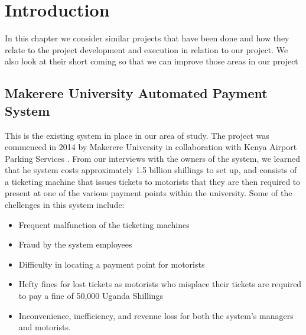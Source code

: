 \section{Introduction}
In this chapter we consider similar projects that have been done and how they relate to the project development and execution in relation to our project. We also look at their short coming so that we can improve those areas in our project

\subsection{Makerere University Automated Payment System}
This is the existing system in place in our area of study. The project was commenced in 2014 by Makerere University in collaboration with Kenya Airport Parking Services . From our interviews with the owners of the system, we learned that he system costs approximately 1.5 billion shillings to set up, and consists of a ticketing machine that issues tickets to motorists that they are then required to present at one of the various payment points within the university. Some of the chellenges in this system include:
\begin{itemize}
    \item Frequent malfunction of the ticketing machines
    \item Fraud by the system employees
    \item Difficulty in locating a payment point for motorists
    \item Hefty fines for lost tickets as motorists who misplace their tickets are required to pay a fine of 50,000 Uganda Shillings
    \item Inconvenience, inefficiency, and revenue loss for both the system’s managers and motorists.
\end{itemize}

